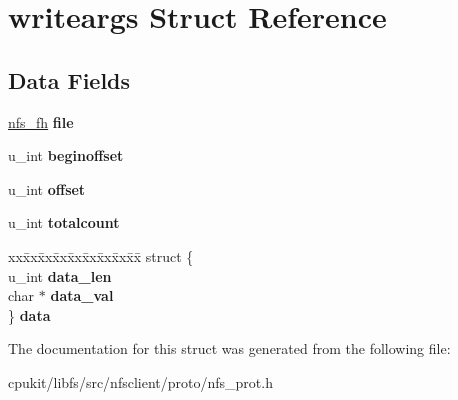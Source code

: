 \hypertarget{structwriteargs}{}\section{writeargs Struct Reference}
\label{structwriteargs}
\subsection*{Data Fields}
\begin{DoxyCompactItemize}
\item 
\mbox{\label{structwriteargs_a7ec2fbce58bf0ba751c23b29b3527c1d}} 
\mbox{\hyperlink{structnfs__fh}{nfs\+\_\+fh}} {\bfseries file}
\item 
\mbox{\label{structwriteargs_a51a0c6dd24fec86e90ad8de5244320a2}} 
u\+\_\+int {\bfseries beginoffset}
\item 
\mbox{\label{structwriteargs_a6e3d92adf1a12645293fe6058880cbf0}} 
u\+\_\+int {\bfseries offset}
\item 
\mbox{\label{structwriteargs_ad21169a73dd66cd8109c2d8ce157b536}} 
u\+\_\+int {\bfseries totalcount}
\item 
\mbox{\label{structwriteargs_a3c9e35024a3858973f19a67583ebc3de}} 
\begin{tabbing}
xx\=xx\=xx\=xx\=xx\=xx\=xx\=xx\=xx\=\kill
struct \{\\
\>u\_int {\bfseries data\_len}\\
\>char $\ast$ {\bfseries data\_val}\\
\} {\bfseries data}\\

\end{tabbing}\end{DoxyCompactItemize}


The documentation for this struct was generated from the following file\+:\begin{DoxyCompactItemize}
\item 
cpukit/libfs/src/nfsclient/proto/nfs\+\_\+prot.\+h\end{DoxyCompactItemize}
